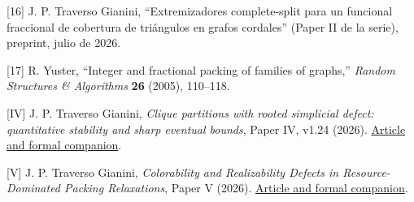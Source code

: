 \documentclass[spanish,11pt,a4paper]{article}
\begin{document}
{[}16{]} J. P. Traverso Gianini, ``Extremizadores complete-split para un
funcional fraccional de cobertura de triángulos en grafos cordales''
(Paper II de la serie), preprint, julio de 2026.

{[}17{]} R. Yuster, ``Integer and fractional packing of families of
graphs,'' \emph{Random Structures \& Algorithms} \textbf{26} (2005),
110--118.

{[}IV{]} J. P. Traverso Gianini, \emph{Clique partitions with rooted
simplicial defect: quantitative stability and sharp eventual bounds},
Paper IV, v1.24 (2026).
\href{https://github.com/jtraverso/erdos-81-chordal-clique-partitions/tree/eb335845bfa23375d5040ea31fc4f4b366346287/preprints/PAPER_IV}{Article
and formal companion}.

{[}V{]} J. P. Traverso Gianini, \emph{Colorability and Realizability
Defects in Resource-Dominated Packing Relaxations}, Paper V (2026).
\href{https://github.com/jtraverso/erdos-81-chordal-clique-partitions/tree/eb335845bfa23375d5040ea31fc4f4b366346287/preprints/PAPER_V}{Article
and formal companion}.
\end{document}
